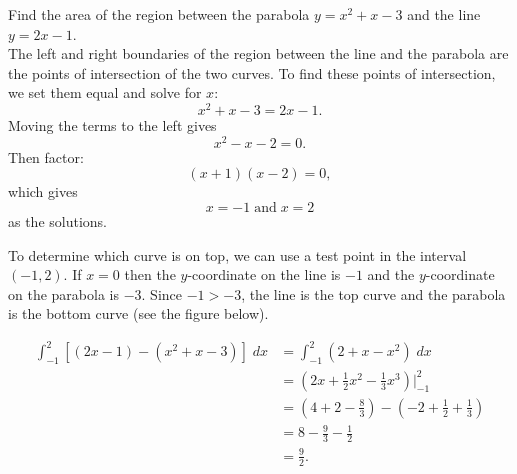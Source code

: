 \documentclass{ximera}
\begin{document}
\begin{example}[example 6]
Find the area of the region between the parabola $y = x^2 + x - 3$ and the line $y = 2x - 1$.\\
 The left and right boundaries of the region between the line and the parabola are 
the points of intersection of the two curves. To find these points of intersection, we set them equal and solve for $x$:
\[
x^2 + x - 3 = 2x-1.
\]
Moving the terms to the left gives
\[
 x^2 -x -2 = 0.
 \]
 Then factor:
 \[
  (x+1)(x-2) = 0,
  \]
  which gives
  \[
   x = -1 \;\text{and}\; x= 2
   \]
   as the solutions.

To determine which curve is on top, we can use a test point in the interval $(-1, 2)$. 
If $x = 0$ then the $y$-coordinate on the line is $-1$ and the $y$-coordinate 
on the parabola is $-3$. Since $-1 > -3$, the line is the top curve and the parabola is the bottom curve (see the figure below).


\begin{align*}
\int_{-1}^2 \left[(2x - 1) - (x^2 + x - 3)\right] \; dx &= \int_{-1}^2 \left(2 + x - x^2\right) \; dx \\
                                           &= \left(2x + \frac12 x^2 - \frac13 x^3 \right) \bigg|_{-1}^2 \\
                                           &= \left(4 + 2 - \frac83 \right) - \left(-2 + \frac12 + \frac13 \right)\\
                                           &= 8 - \frac93 - \frac12 \\
                                           & = \frac{9}{2}.
\end{align*}

\begin{center}
\end{center}
\end{example}
\end{document}
